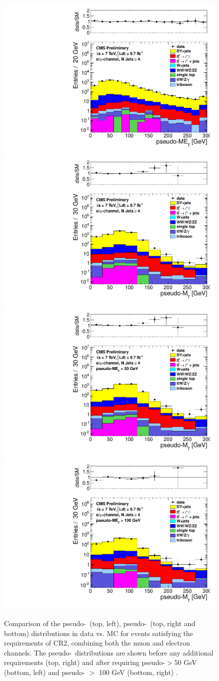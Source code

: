 \begin{figure}[hbt]
  \begin{center}
	\includegraphics[width=0.5\linewidth]{plots/CR2plots/met_lepcor_scaled_nj4_emucomb.pdf}%
	\includegraphics[width=0.5\linewidth]{plots/CR2plots/mt_lepcor_scaled_nj4_emucomb.pdf}
	\includegraphics[width=0.5\linewidth]{plots/CR2plots/mt_lepcor_scaled_met50_nj4_emucomb.pdf}%
	\includegraphics[width=0.5\linewidth]{plots/CR2plots/mt_lepcor_scaled_met100_nj4_emucomb.pdf}

    \caption{
      Comparison of the pseudo-\met\ (top, left), pseudo-\mt\ (top,
      right and bottom) distributions in data vs. MC for events
      satisfying the requirements of CR2, combining both the muon and
      electron channels. The pseudo-\mt\ distributions are shown
      before any additional requirements (top, right) and after
      requiring pseudo-\met $>$50 GeV (bottom, left) and pseudo-\met
      $>$ 100 GeV (bottom, right) .
\label{fig:cr2met} 
}  
      \end{center}
\end{figure}


